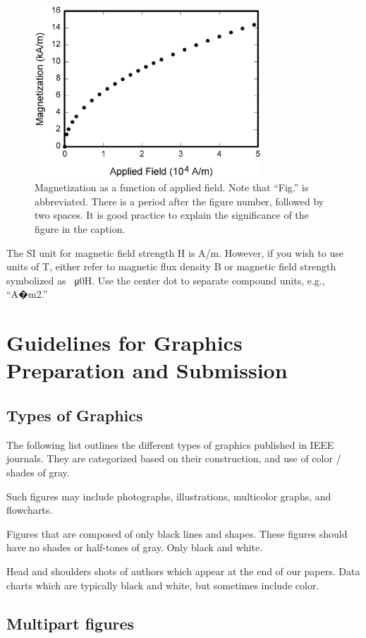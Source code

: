 \documentclass[journal]{IEEEtranTICPS}
\begin{document}
\begin{figure}[!t]\centering
	\includegraphics[width=8.5cm]{FIG1.eps}
	\caption{Magnetization as a function of applied field. Note that ``Fig.'' is abbreviated. There is a period after the figure number, followed by two spaces. It is good practice to explain the significance of the figure in the caption.}\label{FIG_1}
\end{figure}


The SI unit for magnetic field strength H is A/m. However, if you wish to use units of T, either refer to magnetic flux density B or magnetic field strength symbolized as \SI{}{\micro0H}. Use the center dot to separate compound units, e.g., ``A�m2.''

\section{Guidelines for Graphics Preparation and Submission}

\subsection{Types of Graphics}
The following list outlines the different types of graphics published in IEEE journals. They are categorized based on their construction, and use of color / shades of gray.

Such figures may include photographs, illustrations, multicolor graphs, and flowcharts.

Figures that are composed of only black lines and shapes. These figures should have no shades or half-tones of gray. Only black and white.

Head and shoulders shots of authors which appear at the end of our papers.  Data charts which are typically black and white, but sometimes include color.

\subsection{Multipart figures}
\end{document}
